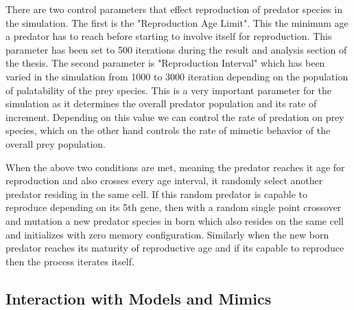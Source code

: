 There are two control parameters that effect reproduction of predator species in the simulation. The first is the "Reproduction Age Limit". This the minimum age a predator has to reach before starting to involve itself for reproduction. This parameter has been set to 500 iterations during the result and analysis section of the thesis. The second parameter is "Reproduction Interval" which has been varied in the simulation from 1000 to 3000 iteration depending on the population of palatability of the prey species. This is a very important parameter for the simulation as it determines the overall predator population and its rate of increment. Depending on this value we can control the rate of predation on prey species, which on the other hand controls the rate of mimetic behavior of the overall prey population.

When the above two conditions are met, meaning the predator reaches it age for reproduction and also crosses every age interval, it randomly select another predator residing in the same cell. If this random predator is capable to reproduce depending on its 5th gene, then with a random single point crossover and mutation a new predator species in born which also resides on the same cell and initializes with zero memory configuration. Similarly when the new born predator reaches its maturity of reproductive age and if its capable to reproduce then the process iterates itself. 

\subsection{Interaction with Models and Mimics}